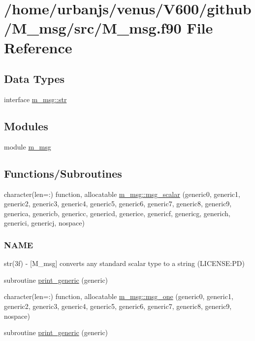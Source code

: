 \hypertarget{M__msg_8f90}{}\section{/home/urbanjs/venus/\+V600/github/\+M\+\_\+msg/src/\+M\+\_\+msg.f90 File Reference}
\label{M__msg_8f90}
\subsection*{Data Types}
\begin{DoxyCompactItemize}
\item 
interface \mbox{\hyperlink{interfacem__msg_1_1str}{m\+\_\+msg\+::str}}
\end{DoxyCompactItemize}
\subsection*{Modules}
\begin{DoxyCompactItemize}
\item 
module \mbox{\hyperlink{namespacem__msg}{m\+\_\+msg}}
\end{DoxyCompactItemize}
\subsection*{Functions/\+Subroutines}
\begin{DoxyCompactItemize}
\item 
character(len=\+:) function, allocatable \mbox{\hyperlink{namespacem__msg_a2e19921e3e57824c605acd4f7c83ad83}{m\+\_\+msg\+::msg\+\_\+scalar}} (generic0, generic1, generic2, generic3, generic4, generic5, generic6, generic7, generic8, generic9, generica, genericb, genericc, genericd, generice, genericf, genericg, generich, generici, genericj, nospace)
\begin{DoxyCompactList}\small\item\em \subsubsection*{N\+A\+ME}

str(3f) -\/ \mbox{[}M\+\_\+msg\mbox{]} converts any standard scalar type to a string (L\+I\+C\+E\+N\+SE\+:PD) \end{DoxyCompactList}\item 
subroutine \mbox{\hyperlink{M__msg_8f90_aaa8ee15f943d8e1543ae35ab732c3cd2}{print\+\_\+generic}} (generic)
\item 
character(len=\+:) function, allocatable \mbox{\hyperlink{namespacem__msg_a069f107ba79e88a43dd5c835080eff1a}{m\+\_\+msg\+::msg\+\_\+one}} (generic0, generic1, generic2, generic3, generic4, generic5, generic6, generic7, generic8, generic9, nospace)
\item 
subroutine \mbox{\hyperlink{M__msg_8f90_a9d5e1620d474ac03a74eeb9b0f7d6ae1}{print\+\_\+generic}} (generic)
\end{DoxyCompactItemize}


